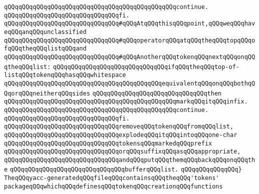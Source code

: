 \verb|qQQqqQQqqQQqqQQqqQQqqQQqqQQqqQQqqQQqqQQqqQQqqQQqcontinue.|\newline
\verb|qQQqqQQqqQQqqQQqqQQqqQQqqQQqqQQqfi.|\newline
\newline
\verb|qQQqqQQqqQQqqQQqqQQqqQQqqQQqqQQq#qQQqAtqQQqthisqQQqpoint,qQQqweqQQqhaveqQQqanqQQqunclassified|\newline
\verb|qQQqqQQqqQQqqQQqqQQqqQQqqQQqqQQq#qQQqoperatorqQQqatqQQqtheqQQqtopqQQqofqQQqtheqQQqlistqQQqand|\newline
\verb|qQQqqQQqqQQqqQQqqQQqqQQqqQQqqQQq#qQQqAnotherqQQqtokenqQQqnextqQQqonqQQqtheqQQqlist:|\newline
\newline
\verb|qQQqqQQqqQQqqQQqqQQqqQQqqQQqqQQqifqQQqtheqQQqtop-of-listqQQqtokenqQQqhasqQQqwhitespace|\newline
\verb|qQQqqQQqqQQqqQQqqQQqqQQqqQQqqQQqqQQqqQQqqQQqequivalentqQQqonqQQqbothqQQqorqQQqneitherqQQqsides|\newline
\verb|qQQqqQQqqQQqqQQqqQQqqQQqqQQqqQQqthen|\newline
\verb|qQQqqQQqqQQqqQQqqQQqqQQqqQQqqQQqqQQqqQQqqQQqqQQqmarkqQQqitqQQqinfix.|\newline
\verb|qQQqqQQqqQQqqQQqqQQqqQQqqQQqqQQqqQQqqQQqqQQqqQQqcontinue.|\newline
\verb|qQQqqQQqqQQqqQQqqQQqqQQqqQQqqQQqfi.|\newline
\newline
\verb|qQQqqQQqqQQqqQQqqQQqqQQqqQQqqQQqremoveqQQqtokenqQQqfromqQQqlist,|\newline
\verb|qQQqqQQqqQQqqQQqqQQqqQQqqQQqqQQqexplodeqQQqitqQQqintoqQQqone-char|\newline
\verb|qQQqqQQqqQQqqQQqqQQqqQQqqQQqqQQqtokensqQQqmarkedqQQqprefix|\newline
\verb|qQQqqQQqqQQqqQQqqQQqqQQqqQQqqQQqorqQQqsuffixqQQqasqQQqappropriate,|\newline
\verb|qQQqqQQqqQQqqQQqqQQqqQQqqQQqqQQqandqQQqputqQQqthemqQQqbackqQQqonqQQqthe|\newline
\verb|qQQqqQQqqQQqqQQqqQQqqQQqqQQqqQQqbufferqQQqlist.|\newline
\verb|qQQqqQQqqQQqqQQq}|\newline
\newline
\newline
\newline
\verb|TheqQQqyacc-generatedqQQqfileqQQqcontainsqQQqtheqQQq'tokens'|\newline
\verb|packageqQQqwhichqQQqdefinesqQQqtokenqQQqcreationqQQqfunctions|\newline
